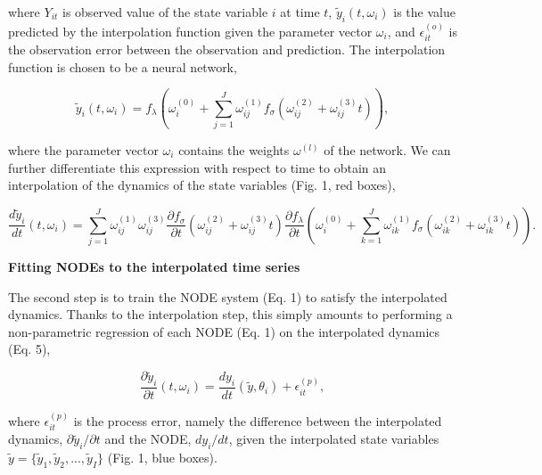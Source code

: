 \documentclass[11pt, oneside]{article}
\begin{document}
where $Y_{it}$ is observed value of the state variable $i$ at time $t$, $\tilde{y}_i(t,\omega_i)$ is the value predicted by the interpolation function given the parameter vector $\omega_i$, and $\epsilon^{(o)}_{it}$ is the observation error between the observation and prediction. 
The interpolation function is chosen to be a neural network,

\vspace{-0.5cm}
\begin{equation}
    \tilde{y}_i (t,\omega_i) = f_\lambda \left( \omega_i^{(0)} + \sum_{j=1}^{J} \omega^{(1)}_{ij} f_\sigma \left( \omega^{(2)}_{ij} + \omega^{(3)}_{ij} t \right) \right),
\end{equation}

where the parameter vector $\omega_i$ contains the weights $\omega^{(l)}$ of the network.
We can further differentiate this expression with respect to time to obtain an interpolation of the dynamics of the state variables (Fig. 1, red boxes), 

\vspace{-0.5cm}
\begin{equation}
    \frac{d\tilde{y}_i}{dt} (t, \omega_i) = \sum_{j=1}^{J} \omega^{(1)}_{ij} \omega^{(3)}_{ij} \frac{\partial f_\sigma}{\partial t} \left(\omega^{(2)}_{ij} + \omega^{(3)}_{ij} t \right) \frac{\partial f_\lambda}{\partial t} \left ( \omega^{(0)}_{i} + \sum_{k=1}^{J} \omega^{(1)}_{ik} f_\sigma \left( \omega^{(2)}_{ik} + \omega^{(3)}_{ik} t \right) \right ). 
\end{equation}

\textbf{Fitting NODEs to the interpolated time series}

The second step is to train the NODE system (Eq. 1) to satisfy the interpolated dynamics.
Thanks to the interpolation step, this simply amounts to performing a non-parametric regression of each NODE (Eq. 1) on the interpolated dynamics (Eq. 5),

\vspace{-0.5cm}
\begin{equation}
    \frac{\partial \tilde{y}_i}{\partial t} (t, \omega_i) = \frac{dy_i}{dt} \left( \tilde{y},\theta_i \right) + \epsilon^{(p)}_{it},
\end{equation}

where $\epsilon^{(p)}_{it}$ is the process error, namely the difference between the interpolated dynamics, $\partial \tilde{y}_i/\partial t$ and the NODE, $dy_i/dt$, given the interpolated state variables $\tilde{y} = \{\tilde{y}_1,\tilde{y}_2, ...,\tilde{y}_I\}$ (Fig. 1, blue boxes). 
\end{document}
